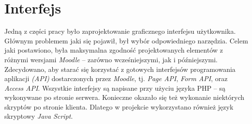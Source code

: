 \section{Interfejs}
\label{Chapter65}

Jedną z części pracy było zaprojektowanie graficznego interfejsu użytkownika. Głównym problemem jaki się pojawił, był wybór odpowiedniego narzędzia. Celem jaki postawiono, była maksymalna zgodność projektowanych elementów z różnymi wersjami \emph{Moodle} -- zarówno wcześniejszymi, jak i późniejszymi. Zdecydowano, aby starać się korzystać z gotowych interfejsów programowania aplikacji \emph{(API)} dostarczonych przez \emph{Moodle}, tj. \emph{Page API}, \emph{Form API}, oraz \emph{Access API}. Wszystkie interfejsy są napisane przy użyciu języka PHP -- są wykonywane po stronie serwera. Konieczne okazało się też wykonanie niektórych skryptów po stronie klienta. Dlatego w projekcie wykorzystano również język skryptowy \emph{Java Script}.